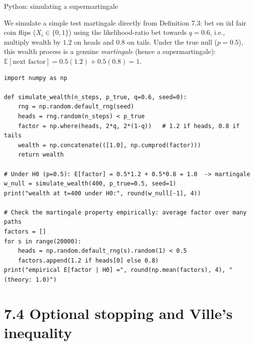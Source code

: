\documentclass[aspectratio=169,10pt]{beamer}
\begin{document}
\begin{frame}[fragile]{Python: simulating a supermartingale}

We simulate a simple test martingale directly from Definition 7.3: bet on iid fair coin flips ($X_i \in \{0,1\}$)
using the likelihood-ratio bet towards $q=0.6$, i.e., multiply wealth by $1.2$ on heads and $0.8$ on tails.
Under the true null ($p=0.5$), this wealth process is a genuine \emph{martingale} (hence a supermartingale):
$\mathbb{E}[\text{next factor}] = 0.5(1.2) + 0.5(0.8) = 1$.

\begin{lstlisting}
import numpy as np

def simulate_wealth(n_steps, p_true, q=0.6, seed=0):
    rng = np.random.default_rng(seed)
    heads = rng.random(n_steps) < p_true
    factor = np.where(heads, 2*q, 2*(1-q))   # 1.2 if heads, 0.8 if tails
    wealth = np.concatenate(([1.0], np.cumprod(factor)))
    return wealth

# Under H0 (p=0.5): E[factor] = 0.5*1.2 + 0.5*0.8 = 1.0  -> martingale
w_null = simulate_wealth(400, p_true=0.5, seed=1)
print("wealth at t=400 under H0:", round(w_null[-1], 4))

# Check the martingale property empirically: average factor over many paths
factors = []
for s in range(20000):
    heads = np.random.default_rng(s).random(1) < 0.5
    factors.append(1.2 if heads[0] else 0.8)
print("empirical E[factor | H0] =", round(np.mean(factors), 4), " (theory: 1.0)")
\end{lstlisting}

\end{frame}

\section{7.4 Optional stopping and Ville's inequality}
\end{document}
